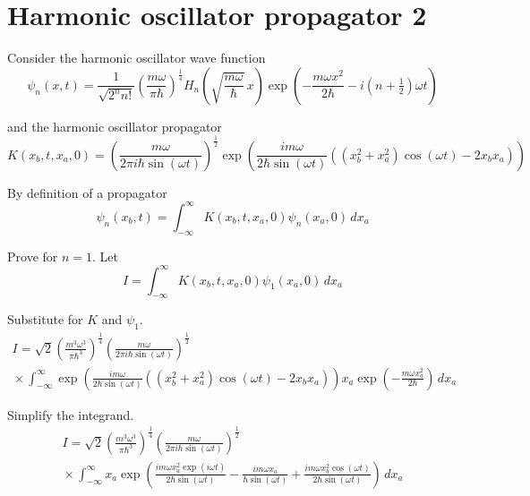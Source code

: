 


\section*{Harmonic oscillator propagator 2}

Consider the harmonic oscillator wave function
\begin{equation*}
\psi_n(x,t)=\frac{1}{\sqrt{2^nn!}}\left(\frac{m\omega}{\pi\hbar}\right)^\frac{1}{4}
H_n\left(\sqrt{\frac{m\omega}{\hbar}}\,x\right)
\exp\left(-\frac{m\omega x^2}{2\hbar}-i\left(n+\tfrac{1}{2}\right)\omega t\right)
\end{equation*}

and the harmonic oscillator propagator
\begin{equation*}
K(x_b,t,x_a,0)
=\left(\frac{m\omega}{2\pi i\hbar\sin(\omega t)}\right)^\frac{1}{2}
\exp\left(
\frac{im\omega}{2\hbar\sin(\omega t)}
\left((x_b^2+x_a^2)\cos(\omega t)-2x_bx_a\right)
\right)
\end{equation*}

By definition of a propagator
\begin{equation*}
\psi_n(x_b,t)=\int_{-\infty}^\infty K(x_b,t,x_a,0)\psi_n(x_a,0)\,dx_a
\end{equation*}

Prove for $n=1$. Let
\begin{equation*}
I=\int_{-\infty}^\infty K(x_b,t,x_a,0)\psi_1(x_a,0)\,dx_a
\end{equation*}

Substitute for $K$ and $\psi_1$.
\begin{multline*}
I=\sqrt2\left(\frac{m^3\omega^3}{\pi\hbar^3}\right)^\frac{1}{4}
\left(\frac{m\omega}{2\pi i\hbar\sin(\omega t)}\right)^\frac{1}{2}
\\
{}\times
\int_{-\infty}^\infty
\exp\left(
\frac{im\omega}{2\hbar\sin(\omega t)}
\left((x_b^2+x_a^2)\cos(\omega t)-2x_bx_a\right)
\right)
x_a\exp\left(-\frac{m\omega x_a^2}{2\hbar}\right)\,dx_a
\end{multline*}

Simplify the integrand.
\begin{multline*}
I=\sqrt2\left(\frac{m^3\omega^3}{\pi\hbar^3}\right)^\frac{1}{4}
\left(\frac{m\omega}{2\pi i\hbar\sin(\omega t)}\right)^\frac{1}{2}
\\
{}\times
\int_{-\infty}^\infty x_a\exp\left(
\frac{im\omega x_a^2\exp(i\omega t)}{2\hbar\sin(\omega t)}
-\frac{im\omega x_a}{\hbar\sin(\omega t)}
+\frac{im\omega x_b^2\cos(\omega t)}{2\hbar\sin(\omega t)}
\right)\,dx_a
\end{multline*}

